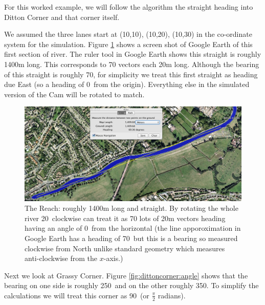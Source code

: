       For this worked example, we will follow the algorithm the straight heading into Ditton Corner and that corner itself.
      
      We assumed the three lanes start at (10,10), (10,20), (10,30) in the co-ordinate system for the simulation. Figure \ref{fig:thereach} shows a  screen shot of Google Earth of this first section of river. The ruler tool in Google Earth shows this straight is roughly 1400m long. This corresponds to 70 vectors each 20m long. Although the bearing of this straight is roughly 70\textdegree, for simplicity we treat this first straight as heading due East (so a heading of 0\textdegree\ from the origin). Everything else in the simulated version of the Cam will be rotated to match.
      
      \begin{figure}
      \begin{center}
        \includegraphics[scale=0.4]{images/TheReach.png}
        \caption{The Reach: roughly 1400m long and straight. By rotating the whole river 20\textdegree \ clockwise can treat it as 70 lots of 20m vectors heading having an angle of 0\textdegree \ from the horizontal (the line apporoximation in Google Earth has a heading of 70\textdegree\ but this is a bearing so measured clockwise from North unlike standard geometry which measures anti-clockwise from the $x$-axis.)}
        \label{fig:thereach}
      \end{center}
      \end{figure}
      
      Next we look at Grassy Corner. Figure \ref{fig:dittoncorner:angle} shows that the bearing on one side is roughly 250\textdegree\  and on the other roughly 350\textdegree. To simplify the calculations we will treat this corner as 90\textdegree\ (or $\frac{\pi}{2}$ radians).
      
